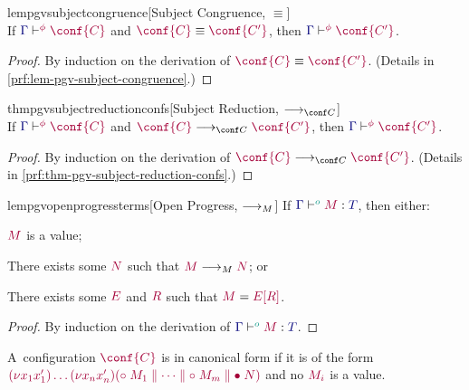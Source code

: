 \documentclass[main.tex]{subfiles}
\begin{document}
\begin{restatablelemma}{lempgvsubjectcongruence}[Subject Congruence, $\equiv$]
  \label{lem:pgv-subject-congruence}
  \hfill\\%
  If $\cseq[\phi]{\ty{\Gamma}}{\conf{C}}$ and $\tm{\conf{C}}\equiv\tm{\conf{C'}}$,
  then $\cseq[\phi]{\ty{\Gamma}}{\conf{C'}}$.
\end{restatablelemma}
\begin{proof}
  By induction on the derivation of $\tm{\conf{C}}\equiv\tm{\conf{C'}}$.
  (Details in \cref{prf:lem-pgv-subject-congruence}.)
\end{proof}

\begin{restatabletheorem}{thmpgvsubjectreductionconfs}[Subject Reduction, $\cred$]
  \label{thm:pgv-subject-reduction-confs}
  \hfill\\%
  If $\cseq[\phi]{\ty{\Gamma}}{\conf{C}}$ and $\tm{\conf{C}}\cred\tm{\conf{C'}}$,
  then $\cseq[\phi]{\ty{\Gamma}}{\conf{C'}}$.
\end{restatabletheorem}
\begin{proof}
  By induction on the derivation of $\tm{\conf{C}}\cred\tm{\conf{C'}}$.
  (Details in \cref{prf:thm-pgv-subject-reduction-confs}.)
\end{proof}

\begin{restatablelemma}{lempgvopenprogressterms}[Open Progress, $\longrightarrow_{M}$]
  \label{lem:pgv-open-progress-terms}
  If $\tseq[\cs{o}]{\ty{\Gamma}}{M}{T}$, then either:
  \begin{description}[labelwidth=8ex]
  \item[Done]
    $\tm{M}$ is a value;
  \item[Step]
    There exists some $\tm{N}$ such that $\tm{M}\tred\tm{N}$; or
  \item[Blocked]
    There exists some $\tm{E}$ and $\tm{R}$ such that $\tm{M}=\tm{\plug{E}{R}}$.
  \end{description}
\end{restatablelemma}
\begin{proof}
  By induction on the derivation of $\tseq[\cs{o}]{\ty{\Gamma}}{M}{T}$.
\end{proof}

\begin{definition}
  \label{def:pgv-canonical-forms}
  A~configuration $\tm{\conf{C}}$ is in canonical form if it is of the form
  \(
    \tm{\res{x_1}{x'_1}{\dots\res{x_n}{x'_n}{(\child\;M_1\parallel\dots\parallel\child\;M_m\parallel\main\;N)}}}
  \)
  and no $\tm{M_i}$ is a value.
\end{definition}
\end{document}
